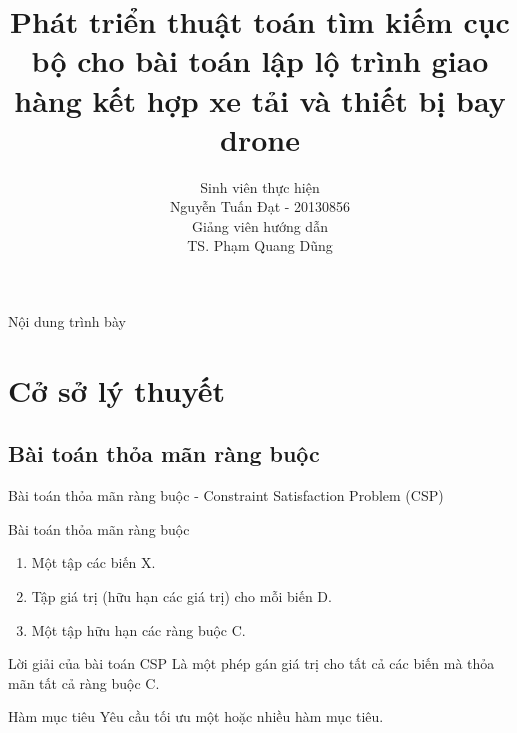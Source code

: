 \documentclass[compress]{beamer}
\title[Phát triển thuật toán tìm kiếm cục bộ cho bài toán lập lộ trình giao hàng kết hợp xe tải và thiết bị bay drone]{Phát triển thuật toán tìm kiếm cục bộ cho bài toán lập lộ trình giao hàng kết hợp xe tải và thiết bị bay drone}
\author[Nguyễn Tuấn Đạt]{
Sinh viên thực hiện\\
Nguyễn Tuấn Đạt - 20130856 \\[1em]
Giảng viên hướng dẫn\\
TS. Phạm Quang Dũng}
\begin{document}
\begin{frame}[plain]
\titlepage
\end{frame}

\begin{frame}[plain]{Nội dung trình bày}
\tableofcontents
\end{frame}

\section{Cở sở lý thuyết}
\subsection{Bài toán thỏa mãn ràng buộc}
\begin{frame}{Bài toán thỏa mãn ràng buộc -  Constraint Satisfaction Problem (CSP) }
\begin{block}{Bài toán thỏa mãn ràng buộc}
\begin{enumerate}
\item Một tập các biến X.
\item Tập giá trị (hữu hạn các giá trị) cho mỗi biến D.
\item Một tập hữu hạn các ràng buộc C.
\end{enumerate}
\end{block}
\begin{block}{Lời giải của bài toán CSP}
Là một phép gán giá trị cho tất cả các biến mà thỏa mãn tất cả ràng buộc C.

\end{block}
\begin{alertblock}{Hàm mục tiêu}
Yêu cầu tối ưu một hoặc nhiều hàm mục tiêu.
\end{alertblock}
\end{frame}
\end{document}
